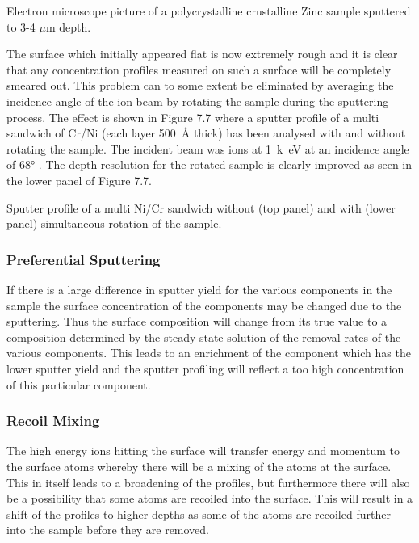  \vspace{11cm}

  Electron microscope picture of a
 polycrystalline crustalline Zinc sample sputtered to 3-4 $\mu$m depth.\\

 \newpage

The surface which initially appeared flat is now extremely rough and it is clear that any concentration profiles measured on such a surface will be completely smeared out. This problem can to some extent be eliminated by averaging the incidence angle of the ion beam by rotating the sample during the sputtering process. The effect is shown in Figure 7.7 where a sputter profile of a multi sandwich of Cr/Ni (each layer \SI{500}{\angstrom} thick) has been analysed with and without rotating the sample. The incident beam was  ions at \SI{1}{k\electronvolt} at an incidence angle of \ang{68} \cite{zalar}. The depth resolution for the rotated sample is clearly improved as seen in the lower panel of Figure 7.7.

  \vspace{11cm}

  Sputter profile of a multi Ni/Cr
 sandwich without (top panel) and with (lower panel)
 simultaneous rotation of the sample.\\

\subsubsection{Preferential Sputtering}
If there is a large difference in sputter yield for the various components in the sample the surface concentration of the components may be changed due to the sputtering. Thus the surface composition will change from its true value to a composition determined by the steady state solution of the removal rates of the various components. This leads to an enrichment of the component which has the lower sputter yield and the sputter profiling will reflect a too high concentration of this particular component.

\subsubsection{Recoil Mixing}
The high energy ions hitting the surface will transfer energy and momentum to the surface atoms whereby there will be a mixing of the atoms at the surface. This in itself leads to a broadening of the profiles, but furthermore there will also be a possibility that some atoms are recoiled into the surface. This will result in a shift of the profiles to higher depths as some of the atoms are recoiled further into the sample before they are removed.

